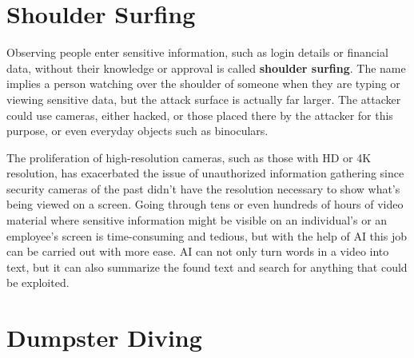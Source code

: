
\section{Shoulder Surfing}


Observing people enter sensitive information, such as login details or financial data, without their knowledge or approval is called \textbf{shoulder surfing}. The name implies a person watching over the shoulder of someone when they are typing or viewing sensitive data, but the attack surface is actually far larger. The attacker could use cameras, either hacked, or those placed there by the attacker for this purpose, or even everyday objects such as binoculars.

The proliferation of high-resolution cameras, such as those with HD or 4K resolution, has exacerbated the issue of unauthorized information gathering since security cameras of the past didn't have the resolution necessary to show what's being viewed on a screen. Going through tens or even hundreds of hours of video material where sensitive information might be visible on an individual's or an employee's screen is time-consuming and tedious, but with the help of AI this job can be carried out with more ease. AI can not only turn words in a video into text, but it can also summarize the found text and search for anything that could be exploited.















\section{Dumpster Diving}

